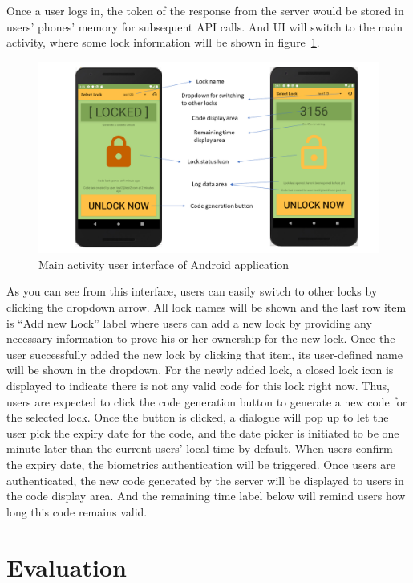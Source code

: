 \documentclass[conference]{IEEEtran}
\begin{document}
Once a user logs in, the token of the response from the server would be stored in users’ phones’ memory for subsequent API calls. And UI will switch to the main activity, where some lock information will be shown in figure~\ref{fig:mainActivity}.

\begin{figure}[h]
\centerline{\includegraphics[width=\textwidth]{img/MainActivity.png}}
\caption{Main activity user interface of Android application}
\label{fig:mainActivity}
\end{figure}

As you can see from this interface, users can easily switch to other locks by clicking the dropdown arrow. All lock names will be shown and the last row item is “Add new Lock” label where users can add a new lock by providing any necessary information to prove his or her ownership for the new lock. Once the user successfully added the new lock by clicking that item, its user-defined name will be shown in the dropdown. For the newly added lock, a closed lock icon is displayed to indicate there is not any valid code for this lock right now. Thus, users are expected to click the code generation button to generate a new code for the selected lock. Once the button is clicked, a dialogue will pop up to let the user pick the expiry date for the code, and the date picker is initiated to be one minute later than the current users’ local time by default. When users confirm the expiry date, the biometrics authentication will be triggered. Once users are authenticated, the new code generated by the server will be displayed to users in the code display area. And the remaining time label below will remind users how long this code remains valid. 


\section{Evaluation}
\end{document}
